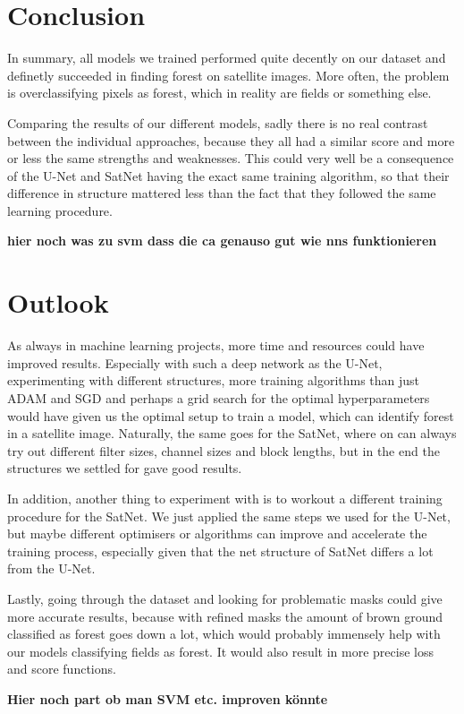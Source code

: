 \section{Conclusion}

In summary, all models we trained performed quite decently on our dataset and definetly succeeded in finding forest on satellite images. More often, the problem is overclassifying pixels as forest, which in reality are fields or something else.

Comparing the results of our different models, sadly there is no real contrast between the individual approaches, because they all had a similar score and more or less the same strengths and weaknesses. This could very well be a consequence of the U-Net and SatNet having the exact same training algorithm, so that their difference in structure mattered less than the fact that they followed the same learning procedure.

\textbf{\color{red} hier noch was zu svm dass die ca genauso gut wie nns funktionieren}\\

\section{Outlook}

As always in machine learning projects, more time and resources could have improved results. Especially with such a deep network as the U-Net, experimenting with different structures, more training algorithms than just ADAM and SGD and perhaps a grid search for the optimal hyperparameters would have given us the optimal setup to train a model, which can identify forest in a satellite image. Naturally, the same goes for the SatNet, where on can always try out different filter sizes, channel sizes and block lengths, but in the end the structures we settled for gave good results.

In addition, another thing to experiment with is to workout a different training procedure for the SatNet. We just applied the same steps we used for the U-Net, but maybe different optimisers or algorithms can improve and accelerate the training process, especially given that the net structure of SatNet differs a lot from the U-Net.

Lastly, going through the dataset and looking for problematic masks could give more accurate results, because with refined masks the amount of brown ground classified as forest goes down a lot, which would probably immensely help with our models classifying fields as forest. It would also result in more precise loss and score functions.

\textbf{\color{red} Hier noch part ob man SVM etc. improven könnte}
